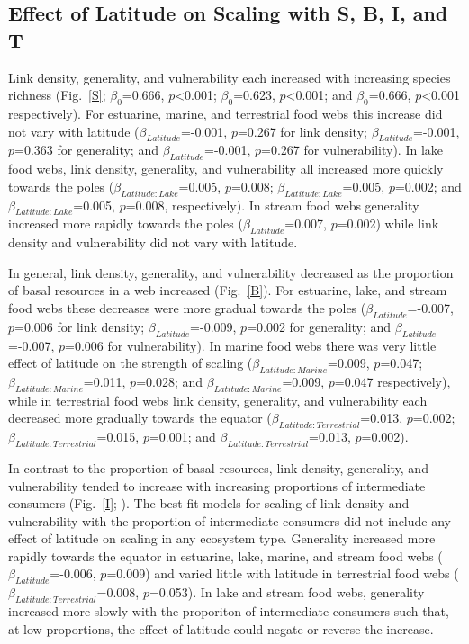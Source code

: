 \documentclass[12pt]{article}
\begin{document}
\begin{spacing}{1.0}
  \subsection*{Effect of Latitude on Scaling with S, B, I, and T}

    Link density, generality, and vulnerability each increased with increasing
    species richness (Fig.~\ref{S}; $\beta_0$=0.666, $p$\textless0.001; $\beta_0$=0.623,
    $p$\textless0.001; and $\beta_0$=0.666, $p$\textless0.001 respectively).  For estuarine,
    marine, and terrestrial food webs this increase did not vary with latitude
    ($\beta_{Latitude}$=-0.001, $p$=0.267 for link density; $\beta_{Latitude}$=-0.001, $p$=0.363 for generality;
    and $\beta_{Latitude}$=-0.001, $p$=0.267 for vulnerability). In lake food webs, link density,
    generality, and vulnerability all increased more quickly towards the poles
    ($\beta_{Latitude:Lake}$=0.005, $p$=0.008; $\beta_{Latitude:Lake}$=0.005,
    $p$=0.002; and $\beta_{Latitude:Lake}$=0.005, $p$=0.008, respectively). In
    stream food webs generality increased more rapidly towards the poles 
    ($\beta_{Latitude}$=0.007, $p$=0.002) while link density and vulnerability did not vary with latitude.


    In general, link density, generality, and vulnerability decreased as the
    proportion of basal resources in a web increased (Fig.~\ref{B}). For
    estuarine, lake, and stream food webs these decreases were more gradual towards the
    poles ($\beta_{Latitude}$=-0.007, $p$=0.006 for link density;
    $\beta_{Latitude}$=-0.009, $p$=0.002 for generality; and
    $\beta_{Latitude}$=-0.007, $p$=0.006 for vulnerability).
    In marine food webs there was very little effect of latitude on
    the strength of scaling ($\beta_{Latitude:Marine}$=0.009, $p$=0.047; 
    $\beta_{Latitude:Marine}$=0.011, $p$=0.028; 
    and $\beta_{Latitude:Marine}$=0.009, $p$=0.047 respectively),
    while in terrestrial food webs link density, generality, and vulnerability each
    decreased more gradually towards the 
    equator ($\beta_{Latitude:Terrestrial}$=0.013, $p$=0.002; 
    $\beta_{Latitude:Terrestrial}$=0.015, $p$=0.001; 
    and $\beta_{Latitude:Terrestrial}$=0.013, $p$=0.002).


    In contrast to the proportion of basal resources, link density, generality,
    and vulnerability tended to increase with increasing proportions of
    intermediate consumers (Fig.~\ref{I}; ). The best-fit models for scaling of link
    density and vulnerability with the proportion of intermediate consumers did
    not include any effect of latitude on scaling in any ecosystem type. Generality
    increased more rapidly towards the equator in estuarine, lake, marine, and
    stream food webs ($\beta_{Latitude}$=-0.006, $p$=0.009) and varied little with
    latitude in terrestrial food webs ($\beta_{Latitude:Terrestrial}$=0.008,
    $p$=0.053). In lake and stream food webs, generality increased more slowly
    with the proporiton of intermediate consumers such that, at low proportions,
    the effect of latitude could negate or reverse the increase.



\end{spacing}
\end{document}
